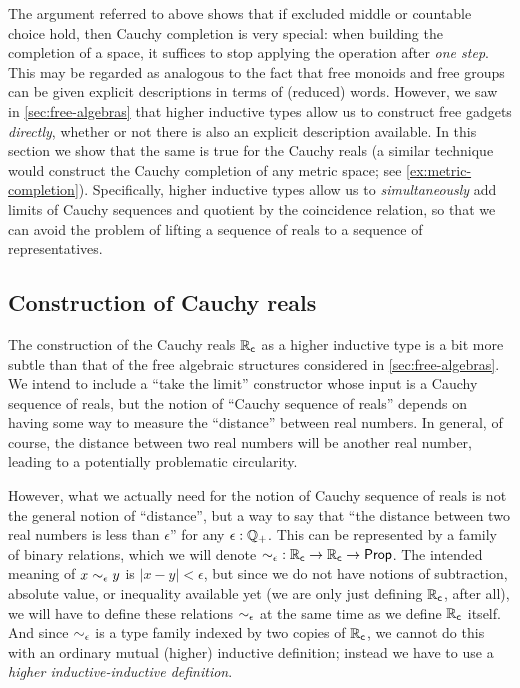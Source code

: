 The argument referred to above shows that if excluded middle or countable choice hold, then Cauchy completion is very special: when building the completion of a space, it suffices to stop applying the operation after \emph{one step}.
This may be regarded as analogous to the fact that free monoids and free groups can be given explicit descriptions in terms of (reduced) words.
However, we saw in \autoref{sec:free-algebras} that higher inductive types allow us to construct free gadgets \emph{directly}, whether or not there is also an explicit description available.
In this section we show that the same is true for the Cauchy reals (a similar technique would construct the Cauchy completion of any metric space; see \autoref{ex:metric-completion}).
Specifically, higher inductive types allow us to \emph{simultaneously} add limits of Cauchy sequences and quotient by the coincidence relation, so that we can avoid the problem of lifting a sequence of reals to a sequence of representatives.
%


\subsection{Construction of Cauchy reals}
\label{sec:constr-cauchy-reals}

The construction of the Cauchy reals $\mathbb{R}_\mathsf{c}$ as a higher inductive type is a bit more subtle than that of the free algebraic structures considered in \autoref{sec:free-algebras}.
We intend to include a ``take the limit'' constructor whose input is a Cauchy sequence of reals, but the notion of ``Cauchy sequence of reals'' depends on having some way to measure the ``distance'' between real numbers.
In general, of course, the distance between two real numbers will be another real number, leading to a potentially problematic circularity.

However, what we actually need for the notion of Cauchy sequence of reals is not the general notion of ``distance'', but a way to say that ``the distance between two real numbers is less than $\epsilon$'' for any $\epsilon:\mathbb{Q}_{+}$.
This can be represented by a family of binary relations, which we will denote $\mathord{\sim_{\epsilon}} : \mathbb{R}_\mathsf{c}\to\mathbb{R}_\mathsf{c}\to \mathsf{Prop}$.
The intended meaning of $x \sim_{\epsilon} y$ is $|x - y| < \epsilon$, but since we do not have notions of subtraction, absolute value, or inequality available yet (we are only just defining $\mathbb{R}_\mathsf{c}$, after all), we will have to define these relations $\sim_{\epsilon}$ at the same time as we define $\mathbb{R}_\mathsf{c}$ itself.
And since $\sim_{\epsilon}$ is a type family indexed by two copies of $\mathbb{R}_\mathsf{c}$, we cannot do this with an ordinary mutual (higher) inductive definition; instead we have to use a \emph{higher inductive-inductive definition}.

